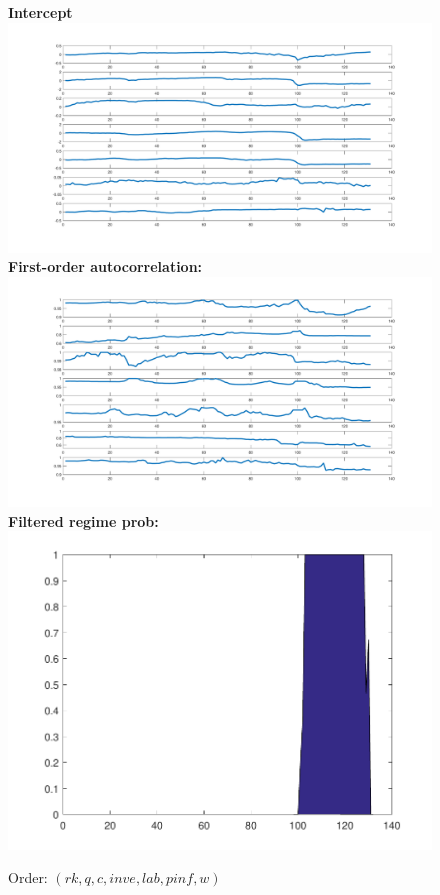 \documentclass[12pt,reqno]{article}
\numberwithin{equation}{section}
\begin{document}
\begin{figure}[H]
\caption{Order: $(rk,q,c,inve,lab,pinf,w)$}
\textbf{Intercept }\\
\includegraphics[scale=0.4]{sw_ar1_learning_alphas.pdf}\\
\textbf{First-order autocorrelation:}\\
\includegraphics[scale=0.4]{sw_ar1_learning_betas.pdf}\\
\textbf{Filtered regime prob:}\\
\includegraphics[scale=0.4]{sw_ar1_regimeProb.pdf}\\
\end{figure}
\end{document}
